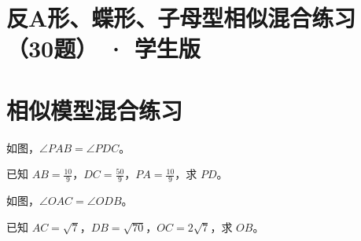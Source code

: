 \documentclass{exam-zh}
\begin{document}
\section*{反A形、蝶形、子母型相似混合练习（30题） · 学生版}

\section*{相似模型混合练习}


\begin{problem}[points=10]
  \noindent
  \begin{minipage}[t]{\dimexpr\linewidth-60mm-6mm\relax}
    \vspace{0pt}
    如图，$\angle PAB=\angle PDC$。

已知 $AB=\frac{10}{9}$，$DC=\frac{50}{9}$，$PA=\frac{10}{9}$，求 $PD$。
    
  \end{minipage}\hfill
  \begin{diagramcoltikz}{60mm}{沿题设等角的顶点顺序，找出两组三角形的对应边。}
  }
  \end{diagramcoltikz}
  \par\medskip
  \answerarea[48mm]
\end{problem}



\begin{problem}[points=10]
  \noindent
  \begin{minipage}[t]{\dimexpr\linewidth-60mm-6mm\relax}
    \vspace{0pt}
    如图，$\angle OAC=\angle ODB$。

已知 $AC=\sqrt{7}$，$DB=\sqrt{70}$，$OC=2\sqrt{7}$，求 $OB$。
    
  \end{minipage}\hfill
  \begin{diagramcoltikz}{60mm}{先用对顶角补齐第二组等角，再按顶点顺序配边。}
  }
  \end{diagramcoltikz}
  \par\medskip
  \answerarea[48mm]
\end{problem}


\end{document}
